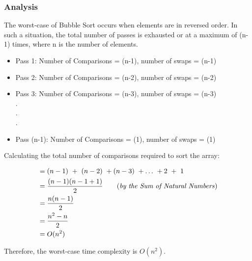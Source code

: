 \subsubsection{Analysis}

The worst-case of Bubble Sort occurs when elements are in reversed order. In such a situation, the total number of passes is exhausted or at a maximum of (n-1) times, where n is the number of elements.
\begin{itemize}
    \item Pass 1: Number of Comparisons = (n-1), number of swaps = (n-1)
    \item Pass 2: Number of Comparisons = (n-2), number of swaps = (n-2)    \item Pass 3: Number of Comparisons = (n-3), number of swaps = (n-3)\\
.\\
.\\
.
\item Pass (n-1): Number of Comparisons = (1), number of swaps = (1)
\end{itemize}

Calculating the total number of comparisons required to sort the array:
\begin{center}
    \begin{align*}
        &= (n-1)\ +\ (n-2)\ + (n-3)\ +\dots\ + 2\ +\ 1\\
        &= \frac{(n-1)(n-1+1)}{2}\tag{\textit{by the Sum of Natural Numbers}}\\
        &= \frac{n(n-1)}{2}\\
        &= \frac{n^2 - n}{2}\\
        &= \textbf{\(O(n^2)\)}
    \end{align*}
\end{center}

Therefore, the worst-case time complexity is \(O(n^2)\).
